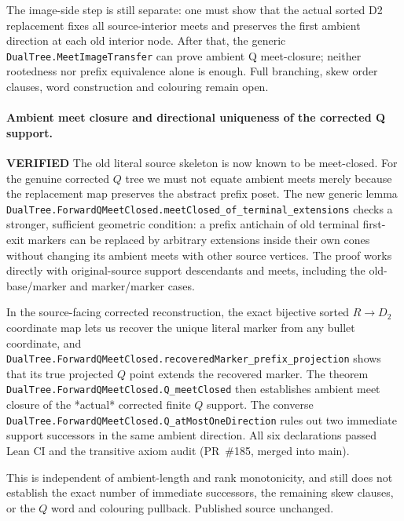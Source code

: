 \documentclass[11pt]{article}
\newcommand{\ok}{\textcolor{green!40!black}{\textbf{VERIFIED}}}
\newcommand{\lean}[1]{\texttt{#1}}
\begin{document}
The image-side step is still separate:
one must show that the actual sorted
D2 replacement fixes all source-interior
meets and preserves the first ambient
direction at each old interior node.
After that, the generic
\lean{DualTree.MeetImageTransfer}
can prove ambient Q meet-closure; neither
rootedness nor prefix equivalence alone
is enough. Full branching, skew order
clauses, word construction and colouring
remain open.

\paragraph{Ambient meet closure and directional uniqueness of the corrected Q support.} \ok
The old literal source skeleton is now known to be meet-closed.
For the genuine corrected $Q$ tree we must not equate ambient
meets merely because the replacement map preserves the abstract
prefix poset. The new generic lemma
\lean{DualTree.ForwardQMeetClosed.meetClosed_of_terminal_extensions}
checks a stronger, sufficient geometric condition: a prefix
antichain of old terminal first-exit markers can be replaced by
arbitrary extensions inside their own cones without changing
its ambient meets with other source vertices. The proof works
directly with original-source support descendants and meets,
including the old-base/marker and marker/marker cases.

In the source-facing corrected reconstruction, the exact
bijective sorted $R\to D_2$ coordinate map lets us recover the
unique literal marker from any bullet coordinate, and
\lean{DualTree.ForwardQMeetClosed.recoveredMarker_prefix_projection}
shows that its true projected $Q$ point extends the recovered
marker. The theorem
\lean{DualTree.ForwardQMeetClosed.Q_meetClosed} then establishes
ambient meet closure of the *actual* corrected finite $Q$ support.
The converse
\lean{DualTree.ForwardQMeetClosed.Q_atMostOneDirection}
rules out two immediate support successors in the same
ambient direction. All six declarations passed Lean CI and the transitive axiom
audit (PR~\#185, merged into main).

This is independent of ambient-length and rank monotonicity,
and still does not establish the exact number of immediate
successors, the remaining skew clauses, or the $Q$ word
and colouring pullback. Published source unchanged.
\end{document}
